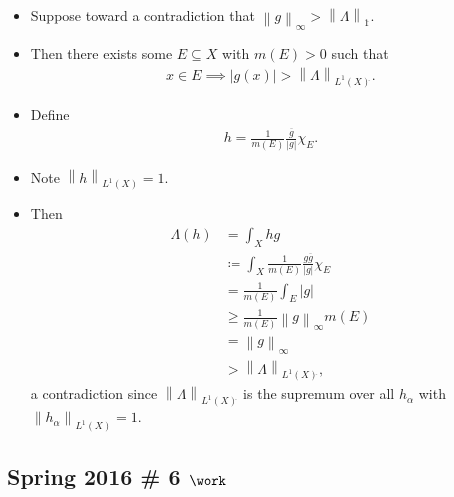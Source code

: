 \begin{solution}
\begin{itemize}
\begin{itemize}
    \begin{itemize}
    \item
      Suppose toward a contradiction that
      \({\left\lVert {g} \right\rVert}_\infty > {\left\lVert {\Lambda} \right\rVert}_{1 {}^{ \check{} }}\).
    \item
      Then there exists some \(E\subseteq X\) with \(m(E) > 0\) such
      that
      \begin{align*}x\in E \implies {\left\lvert {g(x)} \right\rvert} > {\left\lVert {\Lambda} \right\rVert}_{L^1(X) {}^{ \check{} }}.\end{align*}
    \item
      Define
      \begin{align*}
      h = \frac{1}{m(E)} \frac{\overline{g}}{{\left\lvert {g} \right\rvert}} \chi_E
      .\end{align*}
    \item
      Note \({\left\lVert {h} \right\rVert}_{L^1(X)} = 1\).
    \item
      Then
      \begin{align*}
      \Lambda(h) &= \int_X hg \\
      &\coloneqq\int_X \frac{1}{m(E)} \frac{g \overline g}{{\left\lvert {g} \right\rvert}} \chi_E \\
      &= \frac{1}{m(E)} \int_E {\left\lvert {g} \right\rvert} \\
      &\geq \frac{1}{m(E)} {\left\lVert {g} \right\rVert}_\infty m(E) \\
      &= {\left\lVert {g} \right\rVert}_\infty \\
      &> {\left\lVert {\Lambda} \right\rVert}_{L^1(X) {}^{ \check{} }}
      ,\end{align*}
      a contradiction since
      \({\left\lVert {\Lambda} \right\rVert}_{L^1(X) {}^{ \check{} }}\)
      is the supremum over all \(h_\alpha\) with
      \({\left\lVert {h_\alpha} \right\rVert}_{L^1(X)} = 1\).
    \end{itemize}
  \end{itemize}
\end{itemize}

\end{solution}

\hypertarget{spring-2016-6-work}{%
\subsection{\texorpdfstring{Spring 2016 \# 6
\(\work\)}{Spring 2016 \# 6 \textbackslash work}}\label{spring-2016-6-work}}

